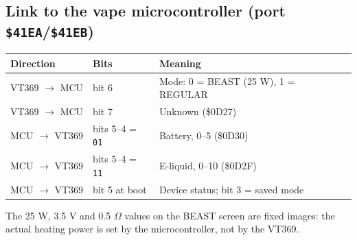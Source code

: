\documentclass{article}
\begin{document}
\subsection*{Link to the vape microcontroller (port \texttt{\$41EA}/\texttt{\$41EB})}

\begin{center}
\begin{tabular}{lll}
\toprule
Direction & Bits & Meaning \\
\midrule
VT369 $\rightarrow$ MCU & bit 6 & Mode: 0 = BEAST (25 W), 1 = REGULAR \\
VT369 $\rightarrow$ MCU & bit 7 & Unknown (\$0D27) \\
MCU $\rightarrow$ VT369 & bits 5--4 = \texttt{01} & Battery, 0--5 (\$0D30) \\
MCU $\rightarrow$ VT369 & bits 5--4 = \texttt{11} & E-liquid, 0--10 (\$0D2F) \\
MCU $\rightarrow$ VT369 & bit 5 at boot & Device status; bit 3 = saved mode \\
\bottomrule
\end{tabular}
\end{center}

The 25 W, 3.5 V and 0.5 $\Omega$ values on the BEAST screen are fixed images:
the actual heating power is set by the microcontroller, not by the VT369.
\end{document}
